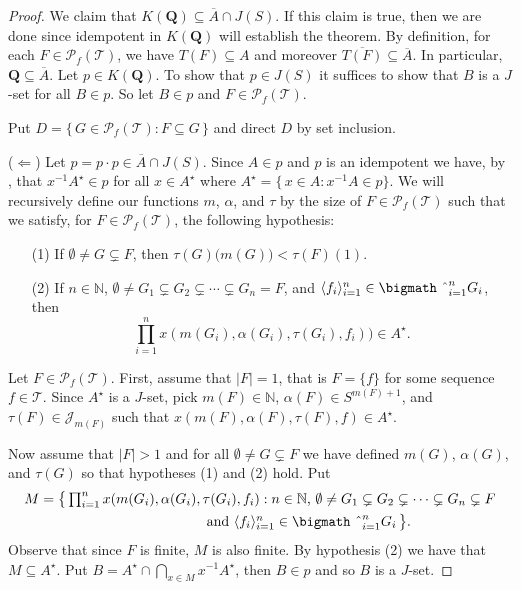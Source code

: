 \documentclass[12pt]{article}
\theoremstyle{plain}
\theoremstyle{definition}
\newcommand{\la}{\langle}
\newcommand{\ra}{\rangle}
\newcommand{\bbN}{\mathbb{N}}
\newcommand{\calJ}{\mathcal{J}}
\newcommand{\calT}{\mathcal{T}}
\newcommand{\Pf}{\mathcal{P}_f}
\newcommand{\bigtimes}{\hbox{\bigmath \char'2}}
\begin{document}
\begin{proof}
  We claim that $K(\mathbf{Q}) \subseteq \overline{A} \cap J(S)$. 
  If this claim is true, then we are done since idempotent in $K(\mathbf{Q})$ will establish the theorem. 
  By definition, for each $F \in \Pf(\calT)$, we have $T(F) \subseteq A$ and moreover $\overline{T(F)} \subseteq \overline{A}$.
  In particular, $\mathbf{Q} \subseteq \overline{A}$. 
  Let $p \in K(\mathbf{Q})$.
  To show that $p \in J(S)$ it suffices to show that $B$ is a $J$-set for all $B \in p$. 
  So let $B \in p$ and $F \in \Pf(\calT)$.  

  Put $D = \{\, G \in \Pf(\calT) : F \subseteq G \,\}$ and direct $D$ by set inclusion. 

  ($\Leftarrow$)
  Let $p = p \cdot p \in \overline{A} \cap J(S)$.
  Since $A \in p$ and $p$ is an idempotent we have, by \cite[Lemma 4.14]{Hindman:1998fk}, that $x^{-1}A^\star \in p$ for all $x \in A^\star$ where $A^\star = \{\, x \in A : x^{-1}A \in p\}$. 
  We will recursively define our functions $m$, $\alpha$, and $\tau$ by the size of $F \in \Pf(\calT)$ such that we satisfy, for $F \in \Pf(\calT)$, the following hypothesis:
  \begin{itemize}
    \item[(1)] If $\emptyset \ne G \subsetneq F$, then $\tau(G)\bigl( m(G) \bigr) < \tau(F)(1)$.
    
    \item[(2)] If $n \in \bbN$, $\emptyset \ne G_1 \subsetneq G_2 \subsetneq \cdots \subsetneq G_n = F$, and $\la f_i \ra_{i=1}^n \in \bigtimes_{i=1}^n G_i$, then \[\textstyle \prod_{i=1}^n x(m(G_i), \alpha(G_i), \tau(G_i), f_i)) \in A^\star.\]
  \end{itemize}

  Let $F \in \Pf(\calT)$.
  First, assume that $|F| = 1$, that is $F = \{f\}$ for some sequence $f \in \calT$.
  Since $A^\star$ is a $J$-set, pick $m(F) \in \bbN$, $\alpha(F) \in S^{m(F)+1}$, and $\tau(F) \in \calJ_{m(F)}$ such that $x(m(F), \alpha(F), \tau(F), f) \in A^\star$. 

  Now assume that $|F| > 1$ and for all $\emptyset \ne G \subsetneq F$ we have defined $m(G)$, $\alpha(G)$, and $\tau(G)$ so that hypotheses (1) and (2) hold.
  Put 
  \begin{align*}
    M &= \bigl\{\, \textstyle \prod_{i=1}^n x(m(G_i), \alpha(G_i), \tau(G_i), f_i) : \mbox{$n \in \bbN$, $\emptyset \ne G_1 \subsetneq G_2 \subsetneq \cdots \subsetneq G_n \subsetneq F$} \\
    &\hspace{12em} \mbox{and $\la f_i \ra_{i=1}^n \in \bigtimes_{i=1}^n G_i$} \,\bigr\}.
  \end{align*}
  Observe that since $F$ is finite, $M$ is also finite.
  By hypothesis (2) we have that $M \subseteq A^\star$.
  Put $B = A^\star \cap \bigcap_{x \in M} x^{-1}A^\star$, then $B \in p$ and so $B$ is a $J$-set. 


\end{proof}
\end{document}
